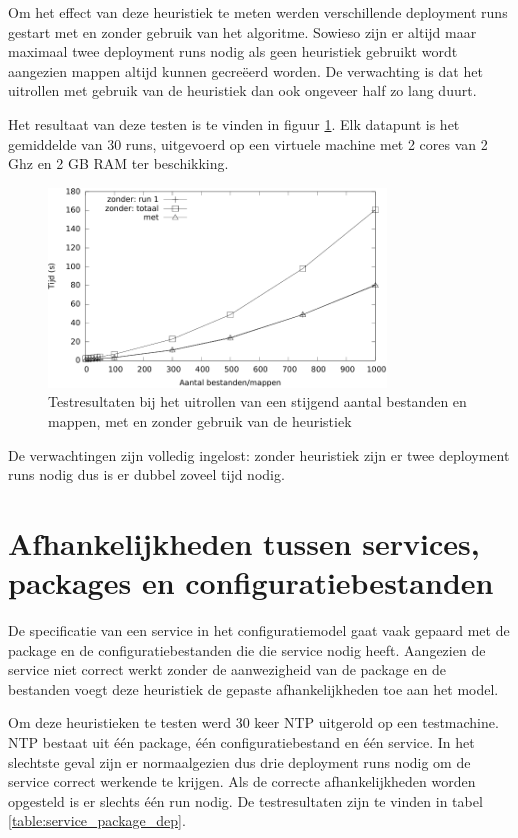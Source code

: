 Om het effect van deze heuristiek te meten werden verschillende deployment runs gestart met en zonder gebruik van het algoritme.
Sowieso zijn er altijd maar maximaal twee deployment runs nodig als geen heuristiek gebruikt wordt aangezien mappen altijd kunnen gecre\"eerd worden.
De verwachting is dat het uitrollen met gebruik van de heuristiek dan ook ongeveer half zo lang duurt.

Het resultaat van deze testen is te vinden in figuur \ref{fig:file_dir_times}.
Elk datapunt is het gemiddelde van 30 runs, uitgevoerd op een virtuele machine met 2 cores van 2 Ghz en 2 GB RAM ter beschikking.

\begin{figure}[h]
    \begin{center}
    \includegraphics[width=0.8\textwidth]{images/file_dir_times.pdf}
    \caption{Testresultaten bij het uitrollen van een stijgend aantal bestanden en mappen, met en zonder gebruik van de heuristiek}
    \label{fig:file_dir_times}
    \end{center}
\end{figure}

De verwachtingen zijn volledig ingelost: zonder heuristiek zijn er twee deployment runs nodig dus is er dubbel zoveel tijd nodig.

\section{Afhankelijkheden tussen services, packages en configuratiebestanden}
\label{sec:srv_pkg_cfg_eval}
De specificatie van een service in het configuratiemodel gaat vaak gepaard met de package en de configuratiebestanden die die service nodig heeft.
Aangezien de service niet correct werkt zonder de aanwezigheid van de package en de bestanden voegt deze heuristiek de gepaste afhankelijkheden toe aan het model.

Om deze heuristieken te testen werd 30 keer NTP uitgerold op een testmachine.
NTP bestaat uit \'e\'en package, \'e\'en configuratiebestand en \'e\'en service. 
In het slechtste geval zijn er normaalgezien dus drie deployment runs nodig om de service correct werkende te krijgen.
Als de correcte afhankelijkheden worden opgesteld is er slechts \'e\'en run nodig.
De testresultaten zijn te vinden in tabel \ref{table:service_package_dep}.

